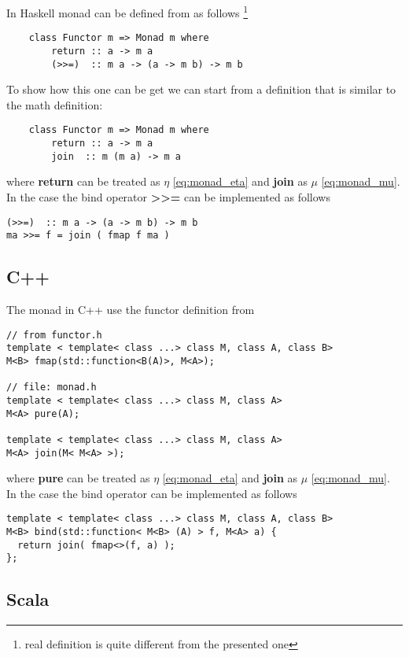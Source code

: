 \begin{example}
\label{ex:monad_haskell}
In Haskell monad can be defined from  as follows 
\footnote{real definition is quite different from the presented one}
\begin{verbatim}
    class Functor m => Monad m where
        return :: a -> m a
        (>>=)  :: m a -> (a -> m b) -> m b
\end{verbatim} 

To show how this one can be get we can start from a definition that is
similar to the math definition:
\begin{verbatim}
    class Functor m => Monad m where
        return :: a -> m a
        join  :: m (m a) -> m a
\end{verbatim} 
where \textbf{return} can be treated as $\eta$
\eqref{eq:monad_eta} and 
\textbf{join} as $\mu$ \eqref{eq:monad_mu}. In the case
the bind operator \textbf{>>=} can be implemented as follows
\begin{verbatim}
(>>=)  :: m a -> (a -> m b) -> m b
ma >>= f = join ( fmap f ma )
\end{verbatim} 

\end{example}

\subsection{C++}
The monad in C++ use the functor definition from 
\begin{verbatim}
// from functor.h
template < template< class ...> class M, class A, class B> 
M<B> fmap(std::function<B(A)>, M<A>);

// file: monad.h
template < template< class ...> class M, class A> 
M<A> pure(A);

template < template< class ...> class M, class A> 
M<A> join(M< M<A> >);
\end{verbatim}
where \textbf{pure} can be treated as $\eta$
\eqref{eq:monad_eta} and 
\textbf{join} as $\mu$ \eqref{eq:monad_mu}. In the case
the bind operator can be implemented as follows
\begin{verbatim}
template < template< class ...> class M, class A, class B> 
M<B> bind(std::function< M<B> (A) > f, M<A> a) {
  return join( fmap<>(f, a) );
};
\end{verbatim}

\subsection{Scala}


